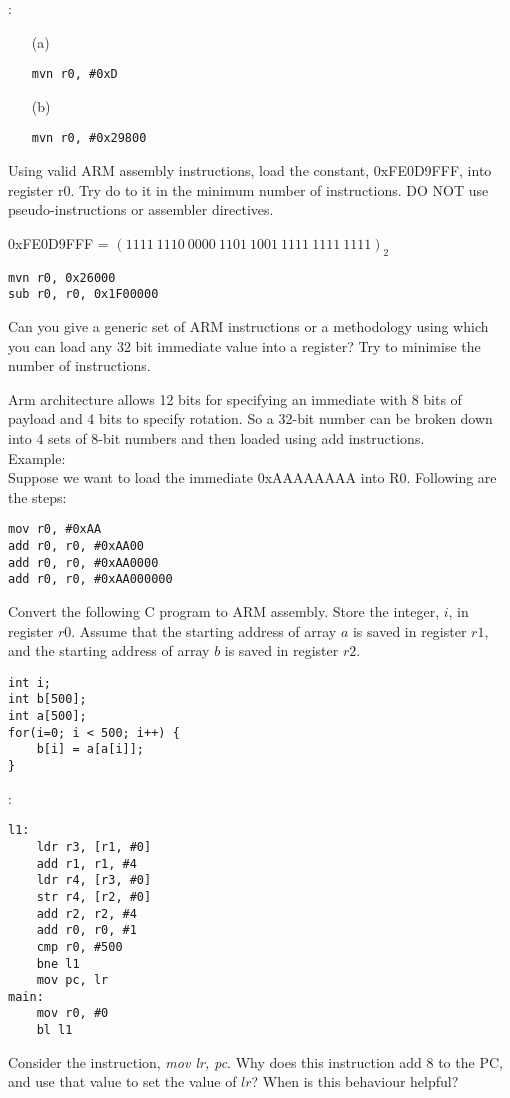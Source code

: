 \begin{ExerciseList}
\Answer:
\begin{enumerate}
\item[(a) ]
\begin{Verbatim}[frame=single]
mvn r0, #0xD
\end{Verbatim}
\item[(b) ]
\begin{Verbatim}[frame=single]
mvn r0, #0x29800
\end{Verbatim}
\end{enumerate}

\Exercise[difficulty=1]
Using valid ARM assembly instructions, load the constant, 
0xFE0D9FFF, into register r0. Try do to it in the minimum number of instructions. DO NOT use pseudo-instructions or assembler directives.

\Answer 0xFE0D9FFF = $(1111\: 1110\: 0000\: 1101\: 1001\: 1111\: 1111\: 1111)_2$
\begin{Verbatim}[frame=single]
mvn r0, 0x26000
sub r0, r0, 0x1F00000
\end{Verbatim}


\Exercise
Can you give a generic set of ARM instructions or a methodology using which you can load any 32 bit immediate value into a register?
Try to minimise the number of instructions. %

\Answer
Arm architecture allows 12 bits for specifying an immediate with 8 bits of payload and 4 bits to specify rotation. So a 32-bit number can be broken down into 4 sets of 8-bit numbers and then loaded using add instructions.
\\
Example: \\Suppose we want to load the immediate 0xAAAAAAAA into R0. Following are the steps:
\begin{Verbatim}[frame=single]
mov r0, #0xAA
add r0, r0, #0xAA00
add r0, r0, #0xAA0000
add r0, r0, #0xAA000000
\end{Verbatim}



\Exercise
Convert the following C program to ARM assembly. 
Store the integer, $i$, in register $r0$. Assume that the
starting address of array $a$ is saved in register $r1$, and the starting address of array $b$ is saved in register
$r2$.

\begin{Verbatim}[frame=single]
int i;
int b[500];
int a[500];
for(i=0; i < 500; i++) {
    b[i] = a[a[i]];
}
\end{Verbatim}

\Answer:
\begin{Verbatim}[frame=single]
l1:
	ldr r3, [r1, #0]
	add r1, r1, #4
	ldr r4, [r3, #0]
	str r4, [r2, #0]
	add r2, r2, #4
	add r0, r0, #1
	cmp r0, #500
	bne l1
	mov pc, lr
main:
	mov r0, #0
	bl l1
\end{Verbatim}

\Exercise[difficulty=2]
Consider the instruction, {\em mov lr, pc}. Why does this instruction add 8 to the PC, and use that value to set
the value of $lr$? When is this behaviour helpful?
\end{ExerciseList}

